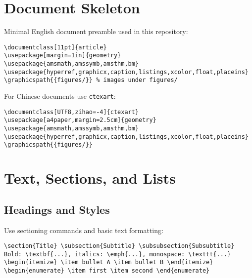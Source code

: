 \documentclass[11pt]{article}
\begin{document}
\section{Document Skeleton}
Minimal English document preamble used in this repository:
\begin{lstlisting}[style=code,caption={Minimal preamble (EN)}]
\documentclass[11pt]{article}
\usepackage[margin=1in]{geometry}
\usepackage{amsmath,amssymb,amsthm,bm}
\usepackage{hyperref,graphicx,caption,listings,xcolor,float,placeins}
\graphicspath{{figures/}} % images under figures/
\end{lstlisting}

For Chinese documents use \texttt{ctexart}:
\begin{lstlisting}[style=code,caption={Minimal preamble (CN)}]
\documentclass[UTF8,zihao=-4]{ctexart}
\usepackage[a4paper,margin=2.5cm]{geometry}
\usepackage{amsmath,amssymb,amsthm,bm}
\usepackage{hyperref,graphicx,caption,listings,xcolor,float,placeins}
\graphicspath{{figures/}}
\end{lstlisting}

\section{Text, Sections, and Lists}
\subsection{Headings and Styles}
Use sectioning commands and basic text formatting:
\begin{lstlisting}[style=code,caption={Text and lists}]
\section{Title} \subsection{Subtitle} \subsubsection{Subsubtitle}
Bold: \textbf{...}, italics: \emph{...}, monospace: \texttt{...}
\begin{itemize} \item bullet A \item bullet B \end{itemize}
\begin{enumerate} \item first \item second \end{enumerate}
\end{lstlisting}
\end{document}
